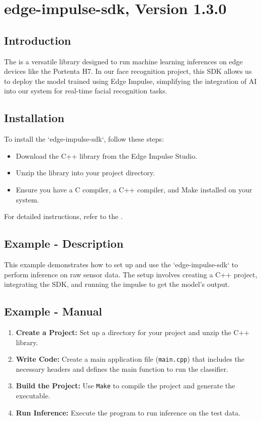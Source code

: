 \section{edge-impulse-sdk, Version 1.3.0}
\subsection{Introduction}
The  is a versatile library designed to run machine learning inferences on edge devices like the Portenta H7. In our face recognition project, this SDK allows us to deploy the model trained using Edge Impulse, simplifying the integration of AI into our system for real-time facial recognition tasks. \cite{edgeimpulse_cpp_library:2024}

\subsection{Installation}

To install the ‘edge-impulse-sdk‘, follow these steps:
\begin{itemize}
	\item Download the C++ library from the Edge Impulse Studio.
	\item Unzip the library into your project directory.
	\item Ensure you have a C compiler, a C++ compiler, and Make installed on your system.
\end{itemize}

For detailed instructions, refer to the .

\subsection{Example - Description}
This example demonstrates how to set up and use the ‘edge-impulse-sdk‘ to perform inference on raw sensor data. The setup involves creating a C++ project, integrating the SDK, and running the impulse to get the model’s output.


\subsection{Example - Manual}

\begin{enumerate}
	\item \textbf{Create a Project:} Set up a directory for your project and unzip the C++ library.
	
	\item \textbf{Write Code:} Create a main application file (\texttt{main.cpp}) that includes the necessary headers and defines the main function to run the classifier.
	
	\item \textbf{Build the Project:} Use \texttt{Make} to compile the project and generate the executable.
	
	\item \textbf{Run Inference:} Execute the program to run inference on the test data.
\end{enumerate}

